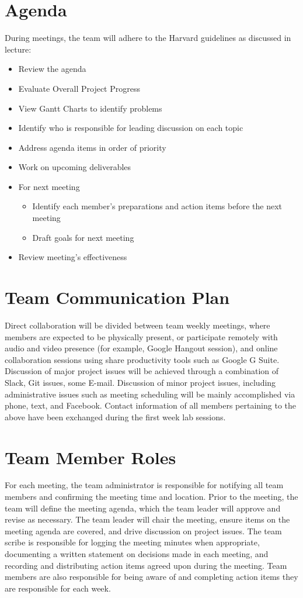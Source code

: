 \documentclass{article}
\begin{document}
\section{Agenda}
During meetings, the team will adhere to the Harvard guidelines as discussed in lecture:
\begin{itemize}
\item Review the agenda
\item Evaluate Overall Project Progress
\item View Gantt Charts to identify problems
\item Identify who is responsible for leading discussion on each topic
\item Address agenda items in order of priority 
\item Work on upcoming deliverables
\item For next meeting
\begin{itemize}
\item Identify each member’s preparations and action items before the next meeting
\item Draft goals for next meeting
\end{itemize}
\item Review meeting’s effectiveness
\end{itemize}

\section{Team Communication Plan}
Direct collaboration will be divided between team weekly meetings, where members are expected to be physically present, or participate remotely with audio and video presence (for example, Google Hangout session), and online collaboration sessions using share productivity tools such as Google G Suite. Discussion of major project issues will be achieved through a combination of Slack, Git issues, some E-mail. Discussion of minor project issues, including administrative issues such as meeting scheduling will be mainly accomplished via phone, text, and Facebook. Contact information of all members pertaining to the above have been exchanged during the first week lab sessions. 


\section{Team Member Roles}
For each meeting, the team administrator is responsible for notifying all team members and confirming the meeting time and location. Prior to the meeting, the team will define the meeting agenda, which the team leader will approve and revise as necessary. The team leader will chair the meeting, ensure items on the meeting agenda are covered, and drive discussion on project issues. The team scribe is responsible for logging the meeting minutes when appropriate, documenting a written statement on decisions made in each meeting, and recording and distributing action items agreed upon during the meeting. Team members are also responsible for being aware of and completing action items they are responsible for each week.
\end{document}
